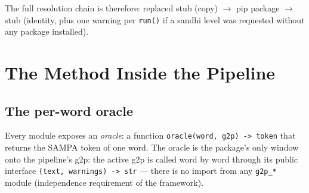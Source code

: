 \documentclass[11pt,a4paper]{report}
\newcommand{\smp}[1]{\texttt{#1}}          %
\begin{document}
The full resolution chain is therefore: replaced stub (copy) $\rightarrow$
pip package $\rightarrow$ stub (identity, plus one warning per \smp{run()}
if a sandhi level was requested without any package installed).

\chapter{The Method Inside the Pipeline}
\label{chap:method}

\section{The per-word oracle}

Every module exposes an \emph{oracle}: a function
\smp{oracle(word, g2p) -> token} that returns the SAMPA token of one word.
The oracle is the package's only window onto the pipeline's g2p: the active
g2p is called word by word through its public interface
\smp{(text, warnings) -> str} — there is no import from any \smp{g2p\_*}
module (independence requirement of the framework).
\end{document}

